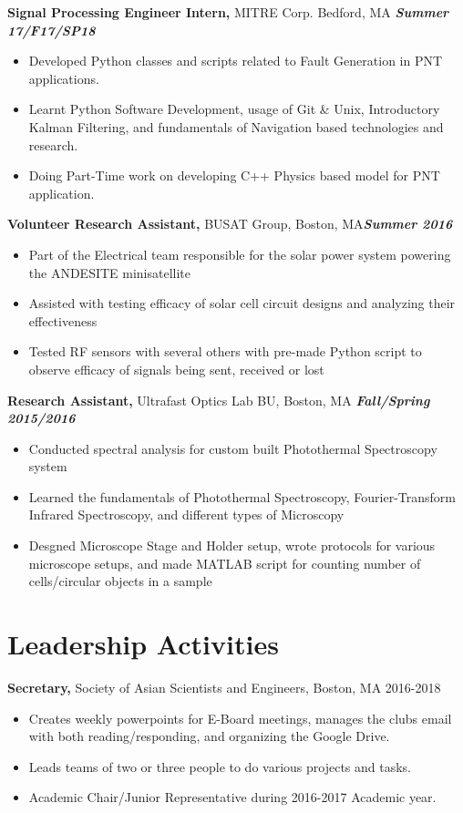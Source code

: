 \documentclass[margin]{res}
\begin{document}
\begin{resume}
 {\bf Signal Processing Engineer Intern,} MITRE Corp. Bedford, MA \hfill \textbf{\textit{Summer 17/F17/SP18}}
 \begin{itemize}  pt  %
 \item Developed Python classes and scripts related to Fault Generation in PNT applications.
 \item Learnt Python Software Development, usage of Git \& Unix, Introductory Kalman Filtering, and fundamentals of Navigation based technologies and research.
 \item Doing Part-Time work on developing C++ Physics based model for PNT application. 
 \end{itemize}

 
 
{\bf Volunteer Research Assistant,} BUSAT Group, Boston, MA\hfill  \textbf{\textit{Summer 2016}}
\begin{itemize} \itemsep -0.1pt %
\item Part of the Electrical team responsible for the solar power system powering the ANDESITE minisatellite
\item Assisted with testing efficacy of solar cell circuit designs and analyzing their effectiveness 
\item Tested RF sensors with several others with pre-made Python script to observe efficacy of signals being sent, received or lost
\end{itemize}


{\bf Research Assistant,} Ultrafast Optics Lab BU, Boston, MA \hfill \textbf{\textit{Fall/Spring 2015/2016}}
			\begin{itemize} \itemsep -2pt
			\item  Conducted spectral analysis for custom built Photothermal Spectroscopy system
			\item Learned the fundamentals of Photothermal Spectroscopy, Fourier-Transform Infrared Spectroscopy, and different types of Microscopy 
			\item Desgned Microscope Stage and Holder setup, wrote protocols for various microscope setups, and made MATLAB script for counting number of cells/circular objects in a sample
			\end{itemize}
\section{Leadership   Activities} 
               {\bf Secretary,} Society of Asian Scientists and Engineers, Boston, MA    \hfill         2016-2018
                \begin{itemize} \itemsep -0.5pt
                \item Creates weekly powerpoints for E-Board meetings, manages the clubs email with both reading/responding, and organizing the Google Drive.
                \item Leads teams of two or three people to do various projects and tasks.
              \item Academic Chair/Junior Representative during 2016-2017 Academic year.


\end{itemize}
\end{resume}
\end{document}
